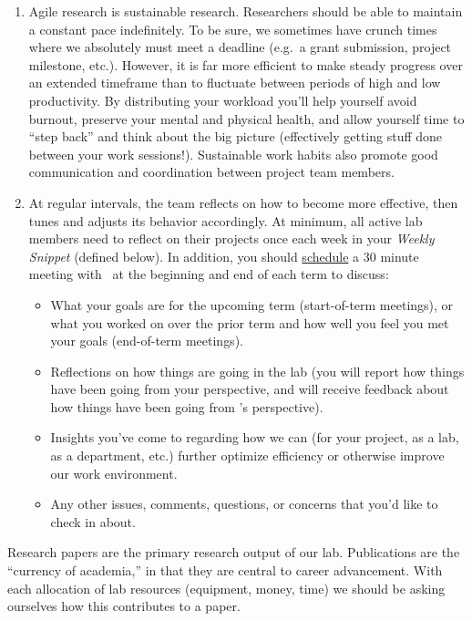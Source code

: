 \documentclass{tufte-book} %
\begin{document}
\begin{enumerate}
\item Agile research is sustainable research.  Researchers should be
  able to maintain a constant pace indefinitely.  To be sure, we
  sometimes have crunch times where we absolutely must meet a deadline
  (e.g.\ a grant submission, project milestone, etc.).  However, it is
  far more efficient to make steady progress over an extended
  timeframe than to fluctuate between periods of high and low productivity.
  By distributing your workload you'll help yourself avoid burnout,
  preserve your mental and physical health, and allow yourself time to
  ``step back'' and think about the big picture (effectively getting
  stuff done between your work sessions!).  Sustainable work habits
  also promote good communication and coordination between project
  team members.

\item At regular intervals, the team reflects on how to become more
  effective, then tunes and adjusts its behavior accordingly.  At
  minimum, all active lab members need to reflect on their projects
  once each week in your \textit{Weekly Snippet} (defined below).  In
  addition, you should
  \href{https://context-lab.youcanbook.me/}{schedule} a 30 minute
  meeting with \director~at the beginning and end of each term to
  discuss:
  \begin{itemize}
  \item What your goals are for the upcoming term (start-of-term
    meetings), or what you worked on over the prior term and how
    well you feel you met your goals (end-of-term meetings).
  \item Reflections on how things are going in the lab (you will
    report how things have been going from your perspective, and will
    receive feedback about how things have been going from \director's
    perspective).
  \item Insights you've come to regarding how we can (for your
    project, as a lab, as a department, etc.) further optimize
    efficiency or otherwise improve our work environment.
  \item Any other issues, comments, questions, or concerns that you'd
    like to check in about.
  \end{itemize}
\end{enumerate}


\noindent Research papers are the primary research output of our lab.
Publications are the ``currency of academia,'' in that they are
central to career advancement.  With each allocation of lab resources
(equipment, money, time) we should be asking ourselves how this
contributes to a paper.
\end{document}
